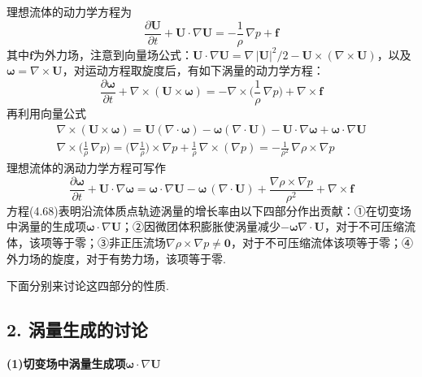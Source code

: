 理想流体的动力学方程为
\[
\frac{\partial\boldsymbol{U}}{\partial t}+\boldsymbol{U}\cdot\nabla\boldsymbol{U}=-\frac{1}{\rho}\,\nabla p+\boldsymbol{f}
\]
其中$\boldsymbol{f}$为外力场，注意到向量场公式：$\boldsymbol{U}\cdot\nabla\boldsymbol{U}=\nabla\,|\boldsymbol{U}|^{2}/2-\boldsymbol{U}\times(\nabla\times\boldsymbol{U})$，以及$\boldsymbol{\omega}=\nabla\times\boldsymbol{U}$，对运动方程取旋度后，有如下涡量的动力学方程：
\begin{equation*}
\frac{\partial\boldsymbol{\omega}}{\partial t}+\nabla\times(\boldsymbol{U}\times\boldsymbol{\omega})=-\nabla\times\Big(\frac{1}{\rho}\,\nabla p\Big)+\nabla\times\boldsymbol{f}
\tag{4.67}
\end{equation*}
再利用向量公式
\begin{gather*}
\nabla\times(\boldsymbol{U}\times\boldsymbol{\omega})=\boldsymbol{U}(\nabla\cdot\boldsymbol{\omega})-\boldsymbol{\omega}(\nabla\cdot\boldsymbol{U})-\boldsymbol{U}\cdot\nabla\boldsymbol{\omega}+\boldsymbol{\omega}\cdot\nabla\boldsymbol{U}\\
\nabla\times\Big(\frac{1}{\rho}\,\nabla p\Big)=\Big(\nabla\frac{1}{\rho}\Big)\times\nabla p+\frac{1}{\rho}\,\nabla\times(\nabla p)=-\frac{1}{\rho^{2}}\,\nabla\rho\times\nabla p
\end{gather*}
理想流体的涡动力学方程可写作
\begin{equation*}
\frac{\partial\boldsymbol{\omega}}{\partial t}+\boldsymbol{U}\cdot\nabla\boldsymbol{\omega}=\boldsymbol{\omega}\cdot\nabla\boldsymbol{U}-\boldsymbol{\omega}\,(\nabla\cdot\boldsymbol{U})+\frac{\nabla\rho\times\nabla p}{\rho^{2}}+\nabla\times\boldsymbol{f}
\tag{4.68}
\end{equation*}
方程(4.68)表明沿流体质点轨迹涡量的增长率由以下四部分作出贡献：①在切变场中涡量的生成项$\boldsymbol{\omega}\cdot\nabla\boldsymbol{U}$；②因微团体积膨胀使涡量减少$-\boldsymbol{\omega}\nabla\cdot\boldsymbol{U}$，对于不可压缩流体，该项等于零；③非正压流场$\nabla\rho\times\nabla p\neq\boldsymbol{0}$，对于不可压缩流体该项等于零；④外力场的旋度，对于有势力场，该项等于零.

下面分别来讨论这四部分的性质.

\subsection*{2. 涡量生成的讨论}

\textbf{(1)切变场中涡量生成项$\boldsymbol{\omega}\cdot\nabla\boldsymbol{U}$}

